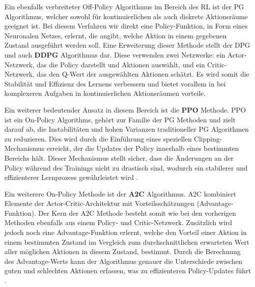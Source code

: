 Ein ebenfalls verbreiteter Off-Policy Algorithmus im Bereich des \ac{RL} ist der \ac{PG} Algorithmus, welcher sowohl für kontinuierlichen als auch diskrete Aktionsräume geeignet ist. Bei diesem Verfahren wir direkt eine Policy-Funktion, in Form eines Neuronalen Netzes, erlernt, die angibt, welche Aktion in einem gegebenen Zustand ausgeführt werden soll.
Eine Erweiterung dieser Methode stellt der \ac{DPG} und auch \textbf{\ac{DDPG}} Algorithmus dar. Diese verwenden zwei Netzwerke: ein Actor-Netzwerk, das die Policy darstellt und Aktionen auswählt, und ein Critic-Netzwerk, das den Q-Wert der ausgewählten Aktionen schätzt. Es wird somit die Stabilität und Effizienz des Lernens verbessern und bietet vorallem in bei komplexeren Aufgaben in kontinuierlichen Aktionsräumen vorteile. 

Ein weiterer bedeutender Ansatz in diesem Bereich ist die \textbf{\ac{PPO}} Methode. \ac{PPO} ist ein On-Policy Algorithms, gehört zur Familie der \ac{PG} Methoden und zielt darauf ab, die Instabilitäten und hohen Varianzen traditioneller \ac{PG} Algorithmen zu reduzieren. Dies wird durch die Einführung eines speziellen Clipping-Mechanismus erreicht, der die Updates der Policy innerhalb eines bestimmten Bereichs hält. Dieser Mechanismus stellt sicher, dass die Änderungen an der Policy während des Trainings nicht zu drastisch sind, wodurch ein stabilerer und effizienterer Lernprozess gewährleistet wird \cite{SchulmanWDRK17}.

Ein weiterere On-Policy Methode ist der \textbf{\ac{A2C}} Algorithmus.
\ac{A2C} kombiniert Elemente der Actor-Critic-Architektur mit Vorteilsschätzungen (Advantage-Funktion). Der Kern der \ac{A2C} Methode besteht somit wie bei den vorherigen Methoden ebenfalls aus einem Policy- und Critic-Netzwerk. Zusätzlich wird jedoch noch eine Advantage-Funktion erlernt, welche den Vorteil einer Aktion in einem bestimmten Zustand im Vergleich zum durchschnittlichen erwarteten Wert aller möglichen Aktionen in diesem Zustand, bestimmt. Durch die Berechnung des Advantage-Werts kann der Algorithmus genauer die Unterschiede zwischen guten und schlechten Aktionen erfassen, was zu effizienteren Policy-Updates führt \cite{MnihBMGLHSK16}.


